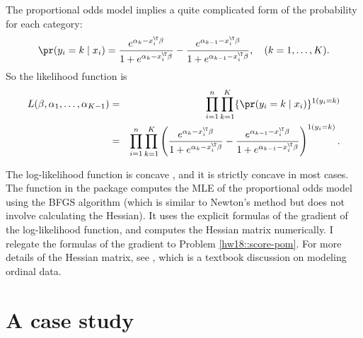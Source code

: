 The proportional odds model implies a quite complicated form
of the probability for each category:
$$
\pr(y_{i}=k\mid x_{i})=\frac{e^{\alpha_{k}-x_{i}^{\T}\beta}}{1+e^{\alpha_{k}-x_{i}^{\T}\beta}}-\frac{e^{\alpha_{k-1}-x_{i}^{\T}\beta}}{1+e^{\alpha_{k-1}-x_{i}^{\T}\beta}}, \quad  (k=1,\ldots,K).
$$
So the likelihood function is
\begin{eqnarray*}
L(\beta,\alpha_{1},\ldots,\alpha_{K-1}) 
&=& \prod_{i=1}^n \prod_{k=1}^K \{ \pr(y_{i}=k\mid x_{i})\}^{1(y_i = k)} \\
&=&  \prod_{i=1}^n \prod_{k=1}^K  \left( \frac{e^{\alpha_{k}-x_{i}^{\T}\beta}}{1+e^{\alpha_{k}-x_{i}^{\T}\beta}}-\frac{e^{\alpha_{k-1}-x_{i}^{\T}\beta}}{1+e^{\alpha_{k-1}-x_{i}^{\T}\beta}}\right)^{1(y_i = k)} .
\end{eqnarray*} 

The log-likelihood function is concave \citep{pratt1981concavity, burridge1981note}, and it is strictly concave in most cases. The function  in the  package  computes the MLE of the proportional odds model using the BFGS algorithm (which is similar to Newton's method but does not involve calculating the Hessian). It uses the explicit formulas of the gradient of the log-likelihood function, and computes the Hessian matrix numerically. I relegate the formulas of the gradient to Problem \ref{hw18::score-pom}. For more details of the Hessian matrix, see \citet{agresti2010analysis}, which is a textbook discussion on modeling ordinal data. 
 
 


\section{A case study}\label{sec::multinomial-case-study}


